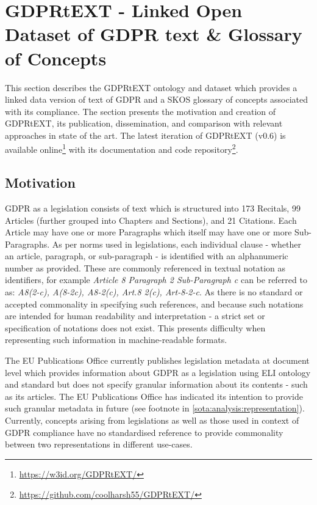 \section{GDPRtEXT - Linked Open Dataset of GDPR text \& Glossary of Concepts}\label{sec:voc:GDPRtEXT}

This section describes the GDPRtEXT ontology and dataset which provides a linked data version of text of GDPR and a SKOS glossary of concepts associated with its compliance. The section presents the motivation and creation of GDPRtEXT, its publication, dissemination, and comparison with relevant approaches in state of the art. The latest iteration of GDPRtEXT (v0.6) is available online\footnote{\url{https://w3id.org/GDPRtEXT/}} with its documentation and code repository\footnote{\url{https://github.com/coolharsh55/GDPRtEXT/}}.

\subsection{Motivation}
GDPR as a legislation consists of text which is structured into 173 Recitals, 99 Articles (further grouped into Chapters and Sections), and 21 Citations. Each Article may have one or more Paragraphs which itself may have one or more Sub-Paragraphs. As per norms used in legislations, each individual clause - whether an article, paragraph, or sub-paragraph - is identified with an alphanumeric number as provided. These are commonly referenced in textual notation as identifiers, for example \textit{Article 8 Paragraph 2 Sub-Paragraph c} can be referred to as: \textit{A8(2-c), A(8-2c), A8-2(c), Art.8 2(c), Art-8-2-c}. As there is no standard or accepted commonality in specifying such references, and because such notations are intended for human readability and interpretation - a strict set or specification of notations does not exist. This presents difficulty when representing such information in machine-readable formats.

The EU Publications Office currently publishes legislation metadata at document level which provides information about GDPR as a legislation using  ELI ontology and standard \cite{thomas_european_2019} but does not specify granular information about its contents - such as its articles. The EU Publications Office has indicated its intention to provide such granular metadata in future (see footnote in \autoref{sota:analysis:representation}).
Currently, concepts arising from legislations as well as those used in context of GDPR compliance have no standardised reference to provide commonality between two representations in different use-cases. 

